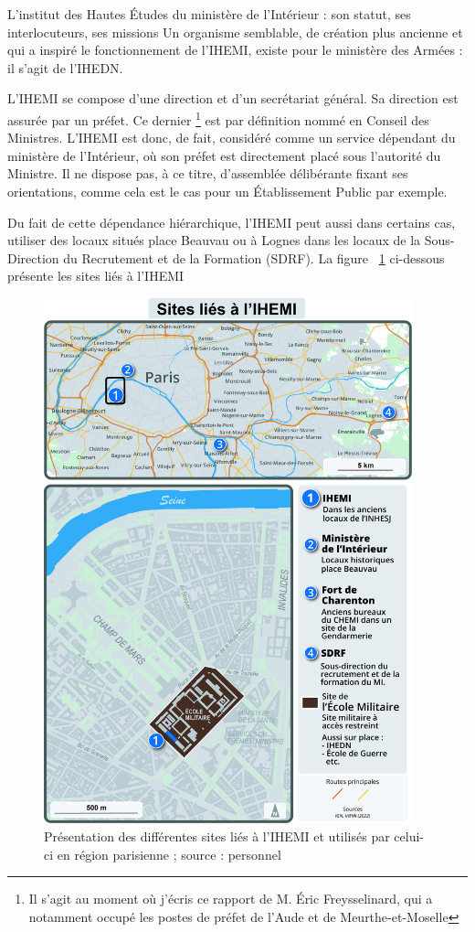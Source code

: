 \documentclass[10pt,a4paper]{report} %
\begin{document}
\begin{part}{L’institut des Hautes Études du ministère de l’Intérieur : son statut, ses interlocuteurs, ses missions}
Un organisme semblable, de création plus ancienne et qui a inspiré le fonctionnement de l’IHEMI, existe pour le ministère des Armées : il s’agit de l’IHEDN.


L’IHEMI se compose d’une direction et d’un secrétariat général. Sa direction est assurée par un préfet. Ce dernier \footnote{Il s’agit au moment où j’écris ce rapport de M. Éric Freysselinard, qui a notamment occupé les postes de préfet de l’Aude et de Meurthe-et-Moselle}  est par définition nommé en Conseil des Ministres. L’IHEMI est donc, de fait, considéré comme un service dépendant du ministère de l’Intérieur, où son préfet est directement placé sous l’autorité du Ministre. Il ne dispose pas, à ce titre, d’assemblée délibérante fixant ses orientations, comme cela est le cas pour un Établissement Public par exemple.

Du fait de cette dépendance hiérarchique, l’IHEMI peut aussi dans certains cas, utiliser des locaux situés place Beauvau ou à Lognes dans les locaux de la Sous-Direction du Recrutement et de la Formation (SDRF). La figure ~\ref{fig1} ci-dessous présente les sites liés à l’IHEMI
\begin{figure}[!t]
    \centering
    \includegraphics[width=0.95\textwidth]{figures/carte_situ.jpg}
    \caption{Présentation des différentes sites liés à l’IHEMI et utilisés par celui-ci en région parisienne ; source : personnel}
    \label{fig1}
\end{figure}


\end{part}
\end{document}
